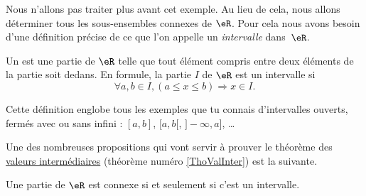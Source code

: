 Nous n'allons pas traiter plus avant cet exemple. Au lieu de cela, nous allons déterminer tous les sous-ensembles connexes de $\eR$. Pour cela nous avons besoin d'une définition précise de ce que l'on appelle un \emph{intervalle} dans~$\eR$.
\begin{definition}
	Un  est une partie de $\eR$ telle que tout élément compris entre deux éléments de la partie soit dedans. En formule, la partie $I$ de $\eR$ est un intervalle si
	\[
	  \forall a,b\in I,(a\leq x\leq b)\Rightarrow x\in I.
	\]
\end{definition}
Cette définition englobe tous les exemples que tu connais d'intervalles ouverts, fermés avec ou sans infini : $[a,b]$, $[a,b[$, $]-\infty,a]$, \ldots

Une des nombreuses propositions qui vont servir à prouver le théorème des \href{http://fr.wikipedia.org/wiki/Théorème_des_valeurs_intermédiaires}{valeurs intermédiaires} (théorème numéro \ref{ThoValInter}) est la suivante.
\begin{proposition}	\label{PropInterssiConn}
	Une partie de $\eR$ est connexe si et seulement si c'est un intervalle.
\end{proposition}

